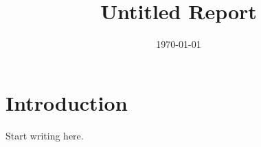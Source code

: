 \documentclass[11pt]{report}
\title{Untitled Report}
\author{}
\date{\today}
\begin{document}
\maketitle
\tableofcontents

\chapter{Introduction}

Start writing here.
\end{document}

